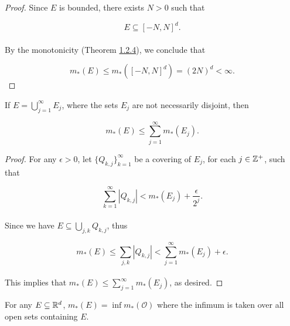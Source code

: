 \documentclass[12pt, a4paper, openany, twoside]{book}
\theoremstyle{definition}
\theoremstyle{remark}
\theoremstyle{plain}
\numberwithin{equation}{section}
\begin{document}
\begin{proof}
    Since $E$ is bounded, there exists $N>0$ such that 
    
    \[E\subseteq[-N,N]^d.\]
    \\
    By the monotonicity (Theorem \hyperref[Theorem 1.2.4]{1.2.4}), we conclude that

    \[m_*(E)\leq m_*([-N,N]^d)=(2N)^d<\infty.\]
\end{proof}
\vspace{5mm}
\begin{tcolorbox}[colback=yellow!10!white,colframe=red!75!black,title=Theorem 1.2.6 (Countable subadditivity)]\label{Theorem 1.2.6}
    If $E=\bigcup_{j=1}^{\infty}{E_j}$, where the sets $E_j$ are not necessarily disjoint, then

    \[m_*(E)\leq \sum_{j=1}^{\infty}{m_*(E_j)}.\]
\end{tcolorbox}
\begin{proof}
    For any $\epsilon>0$, let $\{Q_{k,j}\}_{k=1}^{\infty}$ be a covering of $E_j$, for each $j\in{\mathbb {Z}}^+$, such that 

    \[\sum_{k=1}^{\infty}{|Q_{k,j}|}<m_*(E_j)+\frac{\epsilon}{2^j}.\]
    \\
    Since we have $E\subseteq\bigcup_{j,k}{Q_{k,j}}$, thus

    \[m_*(E)\leq \sum_{j,k}{|Q_{k,j}|}<\sum_{j=1}^{\infty}{m_*(E_j)}+\epsilon.\]
    \\
    This implies that $m_*(E)\leq\sum_{j=1}^{\infty}{m_*(E_j)}$, as desired.
\end{proof}
\vspace{5mm}
\begin{tcolorbox}[colback=yellow!10!white,colframe=red!75!black,title=Theorem 1.2.7]\label{Theorem 1.2.7}
    For any $E\subseteq{\mathbb {R}}^d$, $m_*(E)=\inf{m_*(\mathcal{O})}$ where the infimum is taken over all open sets containing $E$.
\end{tcolorbox}
\end{document}

